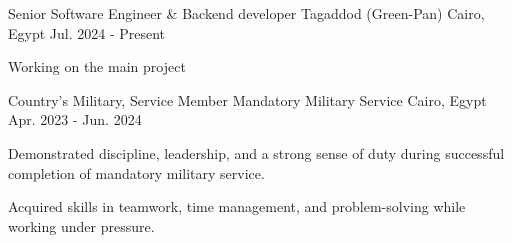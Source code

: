 

\begin{cventries}

  \cventry
    {Senior Software Engineer \& Backend developer} %
    {Tagaddod (Green-Pan)} %
    {Cairo, Egypt} %
    {Jul. 2024 - Present} %
    {
      \begin{cvitems} %
        \item {Working on the main project
        }
      \end{cvitems}
    }

  \cventry
    {Country’s Military, Service Member} %
    {Mandatory Military Service} %
    {Cairo, Egypt} %
    {Apr. 2023 - Jun. 2024 } %
    {
      \begin{cvitems} %
        \item {Demonstrated discipline, leadership, and a strong sense of duty during successful completion of mandatory military service.}
        \item {Acquired skills in teamwork, time management, and problem-solving while working under pressure.}
      \end{cvitems}
    }


\end{cventries}
